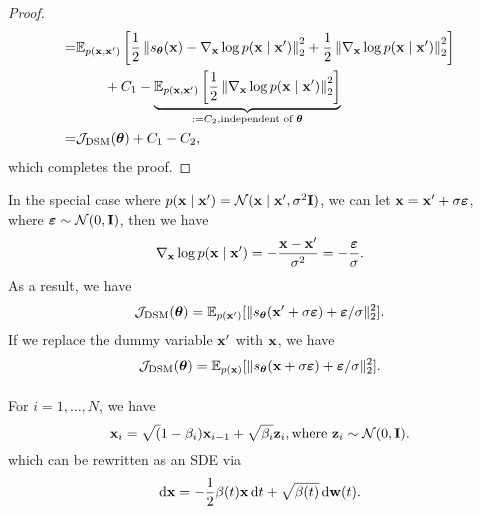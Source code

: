 \begin{proof}
\begin{equation*}
\begin{aligned}
            =&{\mathbb E}_{p({\bf x},{\bf x}')}\left[\frac{1}{2}\left\|s_{\boldsymbol{\theta}}({\bf x})-\nabla_{{\bf x}}\log p({\bf x}\mid{\bf x}')\right\|_{2}^{2}+\frac{1}{2}\left\|\nabla_{{\bf x}}\log p({\bf x}\mid{\bf x}')\right\|_{2}^{2}\right]\\
            &\qquad+C_{1}-\underbrace{{\mathbb E}_{p({\bf x},{\bf x}')}\left[\frac{1}{2}\left\|\nabla_{{\bf x}}\log p({\bf x}\mid{\bf x}')\right\|_{2}^{2}\right]}_{:=C_{2},\text{independent of }\boldsymbol{\theta}}\\
            =&{\mathcal J}_{\text{DSM}}(\boldsymbol{\theta})+C_{1}-C_{2},
        \end{aligned}
    \end{equation*}
    which completes the proof.
\end{proof}


In the special case where \(p({\bf x}\mid{\bf x}')={\mathcal N}({\bf x}\mid{\bf x}',\sigma^{2}{\bf I})\), we can let \({\bf x}={\bf x}'+\sigma\boldsymbol{\varepsilon}\), where \(\boldsymbol{\varepsilon}\sim{\mathcal N}(0,{\bf I})\), then we have
\begin{equation*}
    \nabla_{{\bf x}}\log p({\bf x}\mid{\bf x}')=-\frac{{\bf x}-{\bf x}'}{\sigma^{2}}=-\frac{\boldsymbol{\varepsilon}}{\sigma}.
\end{equation*}
As a result, we have
\begin{equation*}
    {\mathcal J}_{\text{DSM}}(\boldsymbol{\theta})={\mathbb E}_{p({\bf x}')}[\|s_{\boldsymbol{\theta}}({\bf x}'+\sigma\boldsymbol{\varepsilon})+\boldsymbol{\varepsilon}/\sigma\|_{2}^{2}].
\end{equation*}
If we replace the dummy variable \({\bf x}'\) with \({\bf x}\), we have
\begin{equation*}
    {\mathcal J}_{\text{DSM}}(\boldsymbol{\theta})={\mathbb E}_{p({\bf x})}[\|s_{\boldsymbol{\theta}}({\bf x}+\sigma\boldsymbol{\varepsilon})+\boldsymbol{\varepsilon}/\sigma\|_{2}^{2}].
\end{equation*}

\paragraph{}

\begin{example}
For \(i=1,\ldots,N\), we have
\begin{equation*}
    {\bf x}_i=\sqrt(1-\beta_{i}){\bf x}_{i-1}+\sqrt{\beta_{i}}{\bf z}_{i},\text{where }{\bf z}_{i}\sim{\mathcal N}(0,{\bf I}).
\end{equation*}
which can be rewritten as an SDE via
\begin{equation*}
    \mathop{}\!\mathrm{d}{\bf x}=-\frac{1}{2}\beta(t){\bf x}\mathop{}\!\mathrm{d} t+\sqrt{\beta(t)}\mathop{}\!\mathrm{d}{\bf w}(t).
\end{equation*}
\end{example}

